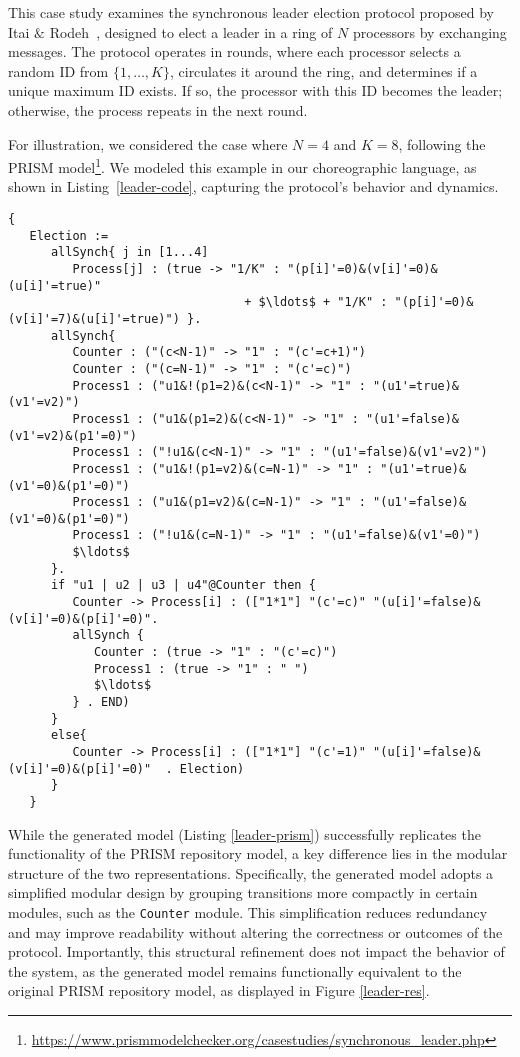 This case study examines the synchronous leader election protocol proposed by Itai $\&$ Rodeh~\cite{IR90}, designed to elect a leader in a ring of $N$ processors by exchanging messages. The protocol operates in rounds, where each processor selects a random ID from $\{1, \ldots, K\}$, circulates it around the ring, and determines if a unique maximum ID exists. If so, the processor with this ID becomes the leader; otherwise, the process repeats in the next round.

For illustration, we considered the case where $ N=4 $ and $ K=8 $, following the PRISM model\footnote{\url{https://www.prismmodelchecker.org/casestudies/synchronous_leader.php}}. We modeled this example in our choreographic language, as shown in Listing~\ref{leader-code}, capturing the protocol's behavior and dynamics.

\begin{lstlisting}[style=chor-color,caption={Choreography for the Synchronous Leader Election Protocol.},captionpos=b,label={leader-code}]
   {
   Election := 
      allSynch{ j in [1...4]
         Process[j] : (true -> "1/K" : "(p[i]'=0)&(v[i]'=0)&(u[i]'=true)" 
                                 + $\ldots$ + "1/K" : "(p[i]'=0)&(v[i]'=7)&(u[i]'=true)") }.
      allSynch{
         Counter : ("(c<N-1)" -> "1" : "(c'=c+1)")
         Counter : ("(c=N-1)" -> "1" : "(c'=c)")
         Process1 : ("u1&!(p1=2)&(c<N-1)" -> "1" : "(u1'=true)&(v1'=v2)")
         Process1 : ("u1&(p1=2)&(c<N-1)" -> "1" : "(u1'=false)&(v1'=v2)&(p1'=0)")
         Process1 : ("!u1&(c<N-1)" -> "1" : "(u1'=false)&(v1'=v2)")
         Process1 : ("u1&!(p1=v2)&(c=N-1)" -> "1" : "(u1'=true)&(v1'=0)&(p1'=0)")
         Process1 : ("u1&(p1=v2)&(c=N-1)" -> "1" : "(u1'=false)&(v1'=0)&(p1'=0)")
         Process1 : ("!u1&(c=N-1)" -> "1" : "(u1'=false)&(v1'=0)")
         $\ldots$
      }.
      if "u1 | u2 | u3 | u4"@Counter then {
         Counter -> Process[i] : (["1*1"] "(c'=c)" "(u[i]'=false)&(v[i]'=0)&(p[i]'=0)". 
         allSynch {
            Counter : (true -> "1" : "(c'=c)")
            Process1 : (true -> "1" : " ")
            $\ldots$               
         } . END)
      }
      else{
         Counter -> Process[i] : (["1*1"] "(c'=1)" "(u[i]'=false)&(v[i]'=0)&(p[i]'=0)"  . Election)
      }      
   }
   \end{lstlisting} 
   While the generated model (Listing \ref{leader-prism}) successfully replicates the functionality of 
   the PRISM repository model, a key difference lies in the modular 
   structure of the two representations. 
   Specifically, the generated model adopts a simplified modular design by 
   grouping transitions more compactly in certain modules, such as the \texttt{Counter} module. 
   This simplification reduces redundancy and may improve readability without altering the correctness or outcomes of the protocol. Importantly, this structural refinement does not impact the behavior of the system, as the generated model remains functionally equivalent to the original PRISM repository model, as displayed in Figure \ref{leader-res}.

